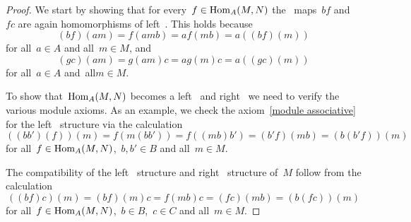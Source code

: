 \begin{proof}
  We start by showing that for every~$f \in \operatorname{Hom}_A(M,N)$ the~{\klin} maps~$bf$ and~$fc$ are again homomorphisms of left~{}.
  This holds because
  \[
      (bf)(am)
    = f(amb)
    = a f(mb)
    = a ((bf)(m))
  \]
  for all~$a \in A$ and all~$m \in M$, and
  \[
      (gc)(am)
    = g(am) c
    = a g(m) c
    = a ((gc)(m))
  \]
  for all~$a \in A$ and~all$m \in M$.
  
  To show that~$\operatorname{Hom}_A(M,N)$ becomes a left~{} and right~{} we need to verify the various module axioms.
  As an example, we check the axiom~\ref{module associative} for the left~{} structure via the calculation
  \[
      ((b b')(f))(m)
    = f(m(bb'))
    = f((mb)b')
    = (b'f)(mb)
    = (b(b'f))(m)
  \]
  for all~$f \in \operatorname{Hom}_A(M,N)$,~$b, b' \in B$ and all~$m \in M$.
  
  The compatibility of the left~{} structure and right~{} structure of~$M$ follow from the calculation
  \[
    ((bf)c)(m)
    = (bf)(m)c
    = f(mb)c
    = (fc)(mb)
    = (b(fc))(m)
  \]
  for all~$f \in \operatorname{Hom}_A(M,N)$,~$b \in B$,~$c \in C$ and all~$m \in M$.
\end{proof}

























